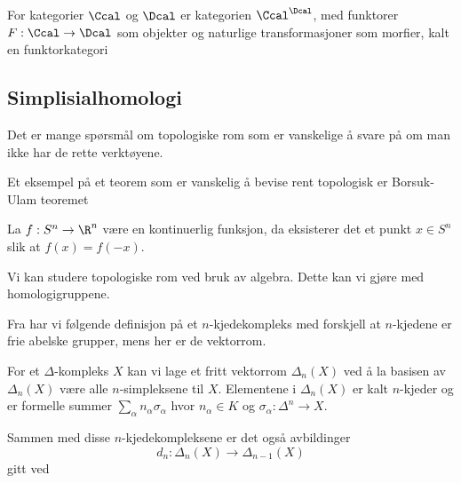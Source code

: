 \begin{definition}\label{Def:FunkKat}
    For kategorier $\Ccal$ og $\Dcal$ er kategorien $\Ccal^\Dcal$, med funktorer $F:\Ccal\to \Dcal$ som objekter og naturlige transformasjoner som morfier, kalt en funktorkategori
\end{definition}

\subsection{Simplisialhomologi}\label{Sec:Homologi}
Det er mange spørsmål om topologiske rom som er vanskelige å svare på om man ikke har de rette verktøyene.

Et eksempel på et teorem som er vanskelig å bevise rent topologisk er Borsuk-Ulam teoremet

\begin{theorem}\label{Thrm:BUtrm}
    La $f: S^n\to\R^n$ være en kontinuerlig funksjon, da eksisterer det et punkt $x\in S^n$ slik at $f(x)=f(-x)$.
\end{theorem}

Vi kan studere topologiske rom ved bruk av algebra. Dette kan vi gjøre med homologigruppene.

Fra \cite{Hatcher2002} har vi følgende definisjon på et $n$-kjedekompleks med forskjell at $n$-kjedene er frie abelske grupper, mens her er de vektorrom.
\begin{definition}\label{Def:label}
    For et $\Delta$-kompleks $X$ kan vi lage et fritt vektorrom $\Delta_n(X)$ ved å la basisen av $\Delta_n(X)$ være alle $n$-simpleksene til $X$. Elementene i $\Delta_n(X)$ er kalt $n$-kjeder og er formelle summer $\sum_\alpha n_\alpha\sigma_\alpha$ hvor $n_\alpha\in K$ og $\sigma_\alpha: \Delta^n\to X$.
\end{definition}
Sammen med disse $n$-kjedekompleksene er det også avbildinger
\[d_n: \Delta_n(X)\to\Delta_{n-1}(X)\]
gitt ved %